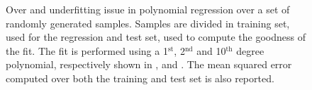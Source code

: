 \begin{figure}[h]
    \begin{minipage}[c]{0.49\linewidth}
        \vspace{0pt}
        \centering
    \end{minipage}%
    \hfill%
    \begin{minipage}[c]{0.49\linewidth}
        \vspace{0pt}
        \centering
    \end{minipage}%
    \caption{Over and underfitting issue in polynomial regression over a set of randomly generated samples. Samples are divided in training set, used for the regression and test set, used to compute the goodness of the fit.
    The fit is performed using a 1$^\text{st}$, 2$^\text{nd}$ and 10$^\text{th}$ degree polynomial, respectively shown in ,  and . The mean squared error computed over both the training and test set is also reported. }
            \label{fig:overunderfit}
\end{figure}







